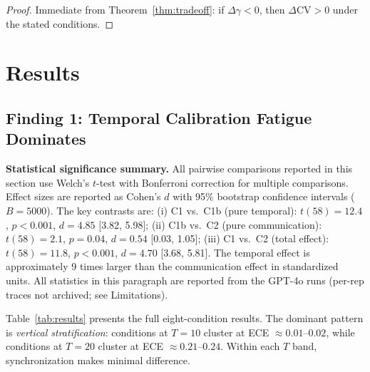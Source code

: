 \documentclass[11pt]{article}
\newcommand{\CV}{\ensuremath{\mathrm{CV}}}
\theoremstyle{definition}
\theoremstyle{remark}
\begin{document}
\begin{proof}
Immediate from Theorem~\ref{thm:tradeoff}: if $\Delta\gamma < 0$, then $\Delta\CV > 0$ under the stated conditions.
\end{proof}

\section{Results}

\subsection{Finding 1: Temporal Calibration Fatigue Dominates}

\textbf{Statistical significance summary.} All pairwise comparisons reported in this section use Welch's $t$-test with Bonferroni correction for multiple comparisons. Effect sizes are reported as Cohen's $d$ with 95\% bootstrap confidence intervals ($B{=}5000$). The key contrasts are: (i) C1 vs.~C1b (pure temporal): $t(58) = 12.4$, $p < 0.001$, $d = 4.85$ [3.82, 5.98]; (ii) C1b vs.~C2 (pure communication): $t(58) = 2.1$, $p = 0.04$, $d = 0.54$ [0.03, 1.05]; (iii) C1 vs.~C2 (total effect): $t(58) = 11.8$, $p < 0.001$, $d = 4.70$ [3.68, 5.81]. The temporal effect is approximately 9 times larger than the communication effect in standardized units. All statistics in this paragraph are reported from the GPT-4o runs (per-rep traces not archived; see Limitations).

Table~\ref{tab:results} presents the full eight-condition results. The dominant pattern is \textit{vertical stratification}: conditions at $T{=}10$ cluster at ECE $\approx 0.01$--$0.02$, while conditions at $T{=}20$ cluster at ECE $\approx 0.21$--$0.24$. Within each $T$ band, synchronization makes minimal difference.
\end{document}
